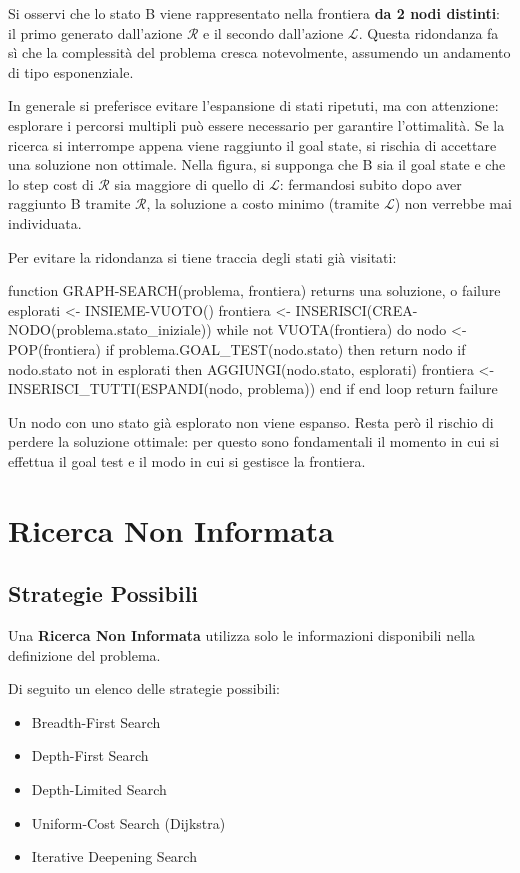 \documentclass[a4paper, 11pt, oneside]{book}
\theoremstyle{definition}
\begin{document}
	Si osservi che lo stato B viene rappresentato nella frontiera \textbf{da 2 nodi distinti}:
	il primo generato dall'azione $\mathcal{R}$ e il secondo dall'azione $\mathcal{L}$.
	Questa ridondanza fa sì che la complessità del problema cresca notevolmente,
	assumendo un andamento di tipo esponenziale.

	In generale si preferisce evitare l'espansione di stati ripetuti, ma con attenzione:
	esplorare i percorsi multipli pu\`o essere necessario per garantire l'ottimalit\`a. Se la
	ricerca si interrompe appena viene raggiunto il goal state, si rischia di accettare
	una soluzione non ottimale. Nella figura, si supponga che B sia il goal state e che
	lo step cost di $\mathcal{R}$ sia maggiore di quello di $\mathcal{L}$: fermandosi
	subito dopo aver raggiunto B tramite $\mathcal{R}$, la soluzione a costo minimo
	(tramite $\mathcal{L}$) non verrebbe mai individuata.

	Per evitare la ridondanza si tiene traccia degli stati gi\`a visitati:


\begin{codice}
function GRAPH-SEARCH(problema, frontiera) returns una soluzione, o failure
    esplorati <- INSIEME-VUOTO()
    frontiera <- INSERISCI(CREA-NODO(problema.stato_iniziale))
    while not VUOTA(frontiera) do
        nodo <- POP(frontiera)
        if problema.GOAL_TEST(nodo.stato) then return nodo
        if nodo.stato not in esplorati then
            AGGIUNGI(nodo.stato, esplorati)
            frontiera <- INSERISCI_TUTTI(ESPANDI(nodo, problema))
        end if
    end loop
    return failure
\end{codice}

	Un nodo con uno stato gi\`a esplorato non viene espanso. Resta per\`o il rischio di
	perdere la soluzione ottimale: per questo sono fondamentali il momento in cui si
	effettua il goal test e il modo in cui si gestisce la frontiera.

	\section{Ricerca Non Informata}
	\subsection{Strategie Possibili}
	Una \textbf{Ricerca Non Informata} utilizza solo le informazioni disponibili nella definizione
	del problema.

	Di seguito un elenco delle strategie possibili:
	\begin{itemize}
		\item Breadth-First Search
		\item Depth-First Search
		\item Depth-Limited Search
		\item Uniform-Cost Search (Dijkstra)
		\item Iterative Deepening Search
	\end{itemize}
\end{document}
